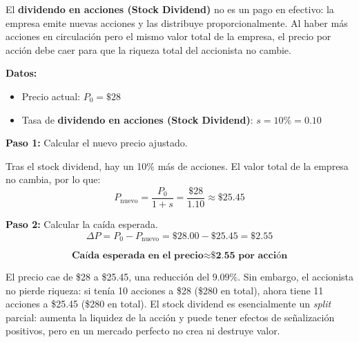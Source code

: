 \documentclass[12pt,a4paper]{article}
\begin{document}
\begin{intuicion}
El \textbf{dividendo en acciones (Stock Dividend)} no es un pago en efectivo:
la empresa emite nuevas acciones y las distribuye proporcionalmente. Al haber
más acciones en circulación pero el mismo valor total de la empresa, el precio
por acción debe caer para que la riqueza total del accionista no cambie.
\end{intuicion}

\textbf{Datos:}
\begin{itemize}
    \item Precio actual: $P_0 = \$28$
    \item Tasa de \textbf{dividendo en acciones (Stock Dividend)}: $s = 10\% = 0.10$
\end{itemize}

\textbf{Paso 1:} Calcular el nuevo precio ajustado.

Tras el stock dividend, hay un 10\% más de acciones. El valor total de la
empresa no cambia, por lo que:
\[
P_{\text{nuevo}} = \frac{P_0}{1 + s} = \frac{\$28}{1.10} \approx \$25.45
\]

\textbf{Paso 2:} Calcular la caída esperada.
\[
\Delta P = P_0 - P_{\text{nuevo}} = \$28.00 - \$25.45 = \$2.55
\]

\[
\textbf{Caída esperada en el precio} \approx \textbf{\$2.55 por acción}
\]

\begin{interpretacion}
El precio cae de \$28 a \$25.45, una reducción del $9.09\%$. Sin embargo,
el accionista no pierde riqueza: si tenía 10 acciones a \$28 (\$280 en
total), ahora tiene 11 acciones a \$25.45 (\$280 en total). El stock
dividend es esencialmente un \textit{split} parcial: aumenta la liquidez
de la acción y puede tener efectos de señalización positivos, pero en un
mercado perfecto no crea ni destruye valor.
\end{interpretacion}
\end{document}
